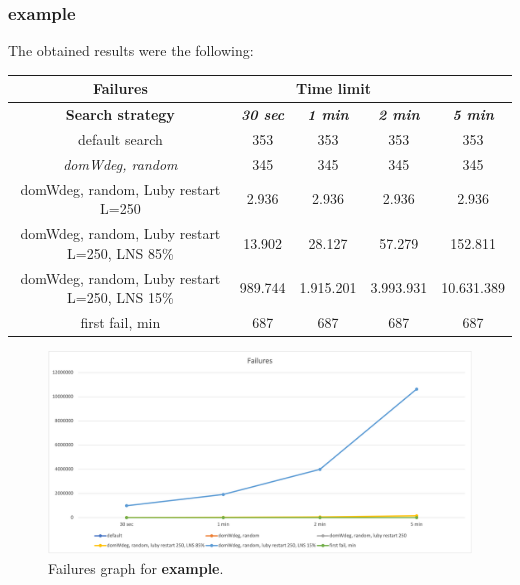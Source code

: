 \subsubsection{example}
\label{subsubsec:example}
The obtained results were the following:
{
\renewcommand{\arraystretch}{2}
\begin{longtable}[h]{| c | c | c | c | c |}
    \hline
    \textbf{Failures} & \multicolumn{3}{c}{\textbf{Time limit}} & \\
    \hline
    \textbf{Search strategy} & \textbf{\textit{30 sec}} & \textbf{\textit{1 min}} & \textbf{\textit{2 min}} & \textbf{\textit{5 min}} \\
    \hline
    \endhead
    default search                                &    353 &     353 &     353 &      353 \\
    \hline
    \textit{domWdeg, random}                      &    345 &     345 &     345 &      345 \\
    \hline
    domWdeg, random, Luby restart L=250           &   2.936 &    2.936 &    2.936 &     2.936 \\
    \hline
    domWdeg, random, Luby restart L=250, LNS 85\% &  13.902 &   28.127 &   57.279 &   152.811 \\
    \hline
    domWdeg, random, Luby restart L=250, LNS 15\% & 989.744 & 1.915.201 & 3.993.931 & 10.631.389 \\
    \hline
    first fail, min                               &    687 &     687 &     687 &      687 \\
    \hline
\end{longtable}
}
\begin{figure}[H]
    \centering
    \includegraphics[width=0.8\columnwidth]{../graphs/example-failures.png}
    \caption{Failures graph for \textbf{example}.}
\end{figure}

